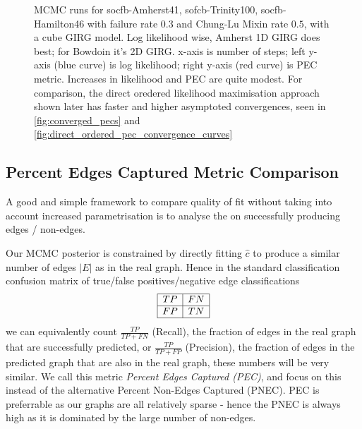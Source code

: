 \begin{figure}



  \caption{MCMC runs for socfb-Amherst41, sofcb-Trinity100, socfb-Hamilton46 with failure rate $0.3$ and Chung-Lu Mixin rate $0.5$, with a cube GIRG model. Log likelihood wise, Amherst 1D GIRG does best; for Bowdoin it's 2D GIRG.
  x-axis is number of steps; left y-axis (blue curve) is log likelihood; right y-axis (red curve) is PEC metric. Increases in likelihood and PEC are quite modest. For comparison, the direct oredered likelihood maximisation approach shown later has faster and higher asymptoted convergences, seen in \cref{fig:converged_pecs} and \cref{fig:direct_ordered_pec_convergence_curves}}
  \label{fig:mcmc_runs}
\end{figure}

\subsection{Percent Edges Captured Metric Comparison}
A good and simple framework to compare quality of fit without taking into account increased parametrisation is to analyse the  on successfully producing edges / non-edges.

Our MCMC posterior is constrained by directly fitting $\hat{c}$ to produce a similar number of edges $|E|$ as in the real graph. Hence in the standard classification confusion matrix of true/false positives/negative edge classifications
\begin{equation}
  \begin{array}{|c|c|}
    \hline
    TP & FN \\
    \hline
    FP & TN \\
    \hline
    \end{array}
\end{equation}
we can equivalently count $\frac{TP}{TP + FN}$ (Recall), the fraction of edges in the real graph that are successfully predicted, or $\frac{TP}{TP + FP}$ (Precision), the fraction of edges in the predicted graph that are also in the real graph, these numbers will be very similar. We call this metric \textit{Percent Edges Captured (PEC)}, and focus on this instead of the alternative Percent Non-Edges Captured (PNEC). PEC is preferrable as our graphs are all relatively sparse - hence the PNEC is always high as it is dominated by the large number of non-edges.


